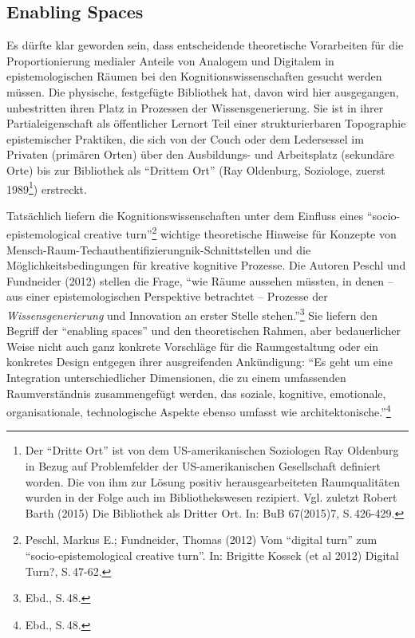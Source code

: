 \documentclass[a4paper,
fontsize=11pt,
oneside,
numbers=noperiodatend,
parskip=half-,
bibliography=totoc,
final
]{scrartcl}
\begin{document}
\subsection*{Enabling Spaces}\label{enabling-spaces}

Es dürfte klar geworden sein, dass entscheidende theoretische
Vorarbeiten für die Proportionierung medialer Anteile von Analogem und
Digitalem in epistemologischen Räumen bei den Kognitionswissenschaften
gesucht werden müssen. Die physische, festgefügte Bibliothek hat, davon
wird hier ausgegangen, unbestritten ihren Platz in Prozessen der
Wissensgenerierung. Sie ist in ihrer Partialeigenschaft als öffentlicher
Lernort Teil einer strukturierbaren Topographie epistemischer Praktiken,
die sich von der Couch oder dem Ledersessel im Privaten (primären Orten)
über den Ausbildungs- und Arbeitsplatz (sekundäre Orte) bis zur
Bibliothek als \enquote{Drittem Ort} (Ray Oldenburg, Soziologe, zuerst
1989\footnote{Der \enquote{Dritte Ort} ist von dem US-amerikanischen
  Soziologen Ray Oldenburg in Bezug auf Problemfelder der
  US-amerikanischen Gesellschaft definiert worden. Die von ihm zur
  Lösung positiv herausgearbeiteten Raumqualitäten wurden in der Folge
  auch im Bibliothekswesen rezipiert. Vgl. zuletzt Robert Barth (2015)
  Die Bibliothek als Dritter Ort. In: BuB 67(2015)7, S.\,426-429.})
erstreckt.

Tatsächlich liefern die Kognitionswissenschaften unter dem Einfluss
eines \enquote{socio-epistemological creative turn}\footnote{Peschl,
  Markus E.; Fundneider, Thomas (2012) Vom \enquote{digital turn} zum
  \enquote{socio-epistemological cre\-ative turn}. In: Brigitte Kossek (et
  al 2012) Digital Turn?, S.\,47-62.} wichtige theoretische Hinweise für
Konzepte von Mensch-Raum-Tech\-authent\-ifizierungnik-Schnitt\-stellen und die
Möglichkeitsbedingungen für kreative kognitive Prozesse. Die Autoren
Peschl und Fundneider (2012) stellen die Frage, \enquote{wie Räume
aussehen müssten, in denen -- aus einer epistemologischen Perspektive
betrachtet -- Prozesse der \emph{Wissensgenerierung} und Innovation an
erster Stelle stehen.}\footnote{Ebd., S.\,48.} Sie liefern den Begriff
der \enquote{enabling spaces} und den theoretischen Rahmen, aber
bedauerlicher Weise nicht auch ganz konkrete Vorschläge für die
Raumgestaltung oder ein konkretes Design entgegen ihrer ausgreifenden
Ankündigung: \enquote{Es geht um eine Integration unterschiedlicher
Dimensionen, die zu einem umfassenden Raumverständnis zusammengefügt
werden, das soziale, kognitive, emotionale, organisationale,
technologische Aspekte ebenso umfasst wie architektonische.}\footnote{Ebd.,
  S.\,48.}
\end{document}

